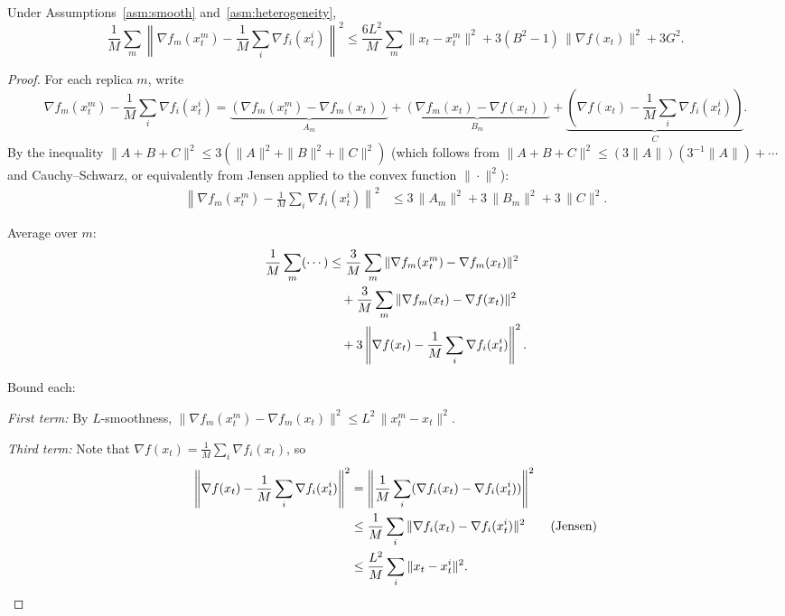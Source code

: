 \documentclass{article}
\begin{document}
\begin{lemma}
\label{lem:het}
Under Assumptions~\ref{asm:smooth} and~\ref{asm:heterogeneity},
\begin{equation}
\frac{1}{M}\sum_m\left\|\nabla f_m(x_t^m)
- \frac{1}{M}\sum_i\nabla f_i(x_t^i)\right\|^2
\leq \frac{6L^2}{M}\sum_m\|x_t - x_t^m\|^2
+ 3(B^2-1)\,\|\nabla f(x_t)\|^2 + 3G^2.
\label{eq:lem_het_statement}
\end{equation}
\end{lemma}

\begin{proof}
For each replica $m$, write
\begin{equation}
\nabla f_m(x_t^m) - \frac{1}{M}\sum_i\nabla f_i(x_t^i)
= \underbrace{(\nabla f_m(x_t^m) - \nabla f_m(x_t))}_{A_m}
+ \underbrace{(\nabla f_m(x_t) - \nabla f(x_t))}_{B_m}
+ \underbrace{(\nabla f(x_t) - \frac{1}{M}\sum_i\nabla f_i(x_t^i))}_{C}.
\label{eq:lem4_abc}
\end{equation}
By the inequality $\|A + B + C\|^2 \leq 3(\|A\|^2 + \|B\|^2 + \|C\|^2)$
(which follows from $\|A + B + C\|^2 \leq (3\|A\|)(3^{-1}\|A\|) + \cdots$
and Cauchy--Schwarz, or equivalently from Jensen applied to the convex function
$\|\cdot\|^2$):
\begin{align}
\left\|\nabla f_m(x_t^m) - \frac{1}{M}\sum_i\nabla f_i(x_t^i)\right\|^2
&\leq 3\,\|A_m\|^2 + 3\,\|B_m\|^2 + 3\,\|C\|^2.
\label{eq:lem4_triangle}
\end{align}

Average over $m$:
\begin{align}
\frac{1}{M}\sum_m(\cdots)
&\leq \frac{3}{M}\sum_m\|\nabla f_m(x_t^m) - \nabla f_m(x_t)\|^2
\notag \\
&\quad+ \frac{3}{M}\sum_m\|\nabla f_m(x_t) - \nabla f(x_t)\|^2
\notag \\
&\quad+ 3\left\|\nabla f(x_t) - \frac{1}{M}\sum_i\nabla f_i(x_t^i)\right\|^2.
\label{eq:lem4_three_terms}
\end{align}

Bound each:

\noindent\emph{First term:} By $L$-smoothness,
$\|\nabla f_m(x_t^m) - \nabla f_m(x_t)\|^2 \leq L^2\,\|x_t^m - x_t\|^2$.

\noindent\emph{Third term:} Note that
$\nabla f(x_t) = \frac{1}{M}\sum_i\nabla f_i(x_t)$, so
\begin{align}
\left\|\nabla f(x_t) - \frac{1}{M}\sum_i\nabla f_i(x_t^i)\right\|^2
&= \left\|\frac{1}{M}\sum_i(\nabla f_i(x_t) - \nabla f_i(x_t^i))\right\|^2
\notag \\
&\leq \frac{1}{M}\sum_i\|\nabla f_i(x_t) - \nabla f_i(x_t^i)\|^2
\qquad\text{(Jensen)} \notag \\
&\leq \frac{L^2}{M}\sum_i\|x_t - x_t^i\|^2.
\label{eq:lem4_third}
\end{align}


\end{proof}
\end{document}
